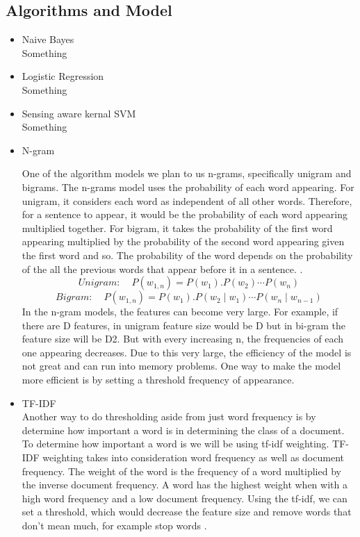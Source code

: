 \documentclass[a4paper, 11pt]{article}
\begin{document}
\subsection{Algorithms and Model }
\begin{itemize} 
	\item Naive Bayes \\
	Something
	\item Logistic Regression \\
	Something
	\item Sensing aware kernal SVM\\
	Something
	\item N-gram
	\par One of the algorithm models we plan to us n-grams, specifically unigram and bigrams.  The n-grams model uses the probability of each word appearing. For unigram, it considers each word as independent of all other words. Therefore, for a sentence to appear, it would be the probability of each word appearing multiplied together. For bigram, it takes the probability of the first word appearing multiplied by the probability of the second word appearing given the first word and so. The probability of the word depends on the probability of the all the previous words that appear before it in a sentence. \cite{song1999general}. \\
	\begin{equation}
		\textit{Unigram:}  \hspace{15pt} P(w_{1,n})  = P(w_1).P(w_2) \cdots P(w_n)
	\end{equation}
	\begin{equation}
	\textit{Bigram:}  \hspace{15pt} P(w_{1,n})  = P(w_1).P(w_2 \mid  w_1) \cdots P(w_n \mid w_{n-1})
	\end{equation}
	In the n-gram models, the features can become very large. For example, if there are D features, in unigram feature size would be D but in bi-gram the feature size will be D2. But with every increasing n, the frequencies of each one appearing decreases. Due to this very large, the efficiency of the model is not great and can run into memory problems. One way to make the model more efficient is by setting a threshold frequency of appearance\cite{furnkranz1998study}.  \\
	
	\item TF-IDF\\
	Another way to do thresholding aside from just word frequency is by determine how important a word is in determining the class of a document. To determine how important a word is we will be using tf-idf weighting. TF-IDF weighting takes into consideration word frequency as well as document frequency. The weight of the word is the frequency of a word multiplied by the inverse document frequency. A word has the highest weight when with a high word frequency and a low document frequency. Using the tf-idf, we can set a threshold, which would decrease the feature size and remove words that don’t mean much, for example stop words \cite{schutze2008introduction}.
	
\end{itemize}
\end{document}
